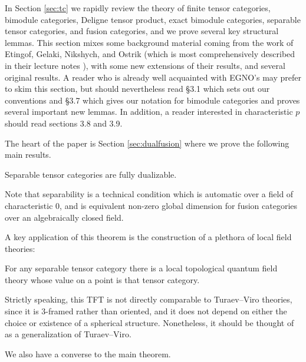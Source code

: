 \documentclass{amsart}
\begin{document}
In Section \ref{sec:tc} we rapidly review the theory of finite tensor categories, bimodule categories, Deligne tensor product, exact bimodule categories, separable tensor categories, and fusion categories, and we prove several key structural lemmas.  This section mixes some background material coming from the work of Etingof, Gelaki, Nikshych, and Ostrik (which is most comprehensively described in their lecture notes \cite{EGNO}), with some new extensions of their results, and several original results.  A reader who is already well acquainted with EGNO's may prefer to skim this section, but should nevertheless read \S 3.1 which sets out our conventions and  \S 3.7 which gives our notation for bimodule categories and proves several important new lemmas.  In addition, a reader interested in characteristic $p$ should read sections 3.8 and 3.9.

The heart of the paper is Section \ref{sec:dualfusion} where we prove the following main results.


\begin{maintheorem}
Separable tensor categories are fully dualizable.
\end{maintheorem}

\nid Note that separability is a technical condition which is automatic over a field of characteristic $0$, and is equivalent non-zero global dimension for fusion categories over an algebraically closed field.


A key application of this theorem is the construction of a plethora of local field theories:
\begin{maincor}
For any separable tensor category there is a local topological quantum field theory whose value on a point is that tensor category.
\end{maincor}

\nid Strictly speaking, this TFT is not directly comparable to Turaev--Viro theories, since it is $3$-framed rather than oriented, and it does not depend on either the choice or existence of a spherical structure.  Nonetheless, it should be thought of as a generalization of Turaev--Viro.

We also have a converse to the main theorem.
\end{document}
